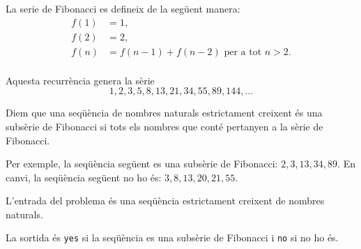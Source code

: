 

\Statement

La serie de Fibonacci es defineix de la següent manera:
\[
\begin{array}{rl}
f(1) &= 1,\\
f(2) &= 2, \\
f(n) &= f(n-1) + f(n-2)  \text{ per a tot } n > 2.\\
\end{array}
\]

Aquesta recurrència genera la sèrie
\[
    1,2,3,5,8,13,21,34,55,89,144,...
\]

Diem que una seqüència de nombres naturals estrictament creixent és una subsèrie de Fibonacci
si tots els nombres que conté pertanyen a la sèrie de Fibonacci.

\medskip

Per exemple, la seqüència següent es una subsèrie de Fibonacci:
$2, 3, 13, 34, 89$.
En canvi, la seqüència següent no ho és:
$3, 8 ,13, 20, 21, 55$.


\Input

L'entrada del problema és una seqüència estrictament creixent de nombres naturals.

\Output

La sortida és \texttt{yes} si la seqüència es una subsèrie de Fibonacci
i \texttt{no} si no ho és.

\Sample

